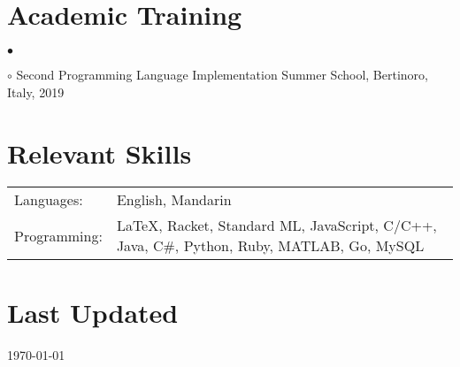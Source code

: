 \documentclass[margin,line]{res}
\newenvironment{list2}{
  \begin{list}{$\bullet$}{%
      \setlength{\itemsep}{0in}
      \setlength{\parsep}{0in} \setlength{\parskip}{0in}
      \setlength{\topsep}{0in} \setlength{\partopsep}{0in}
      \setlength{\leftmargin}{0.2in}}}{\end{list}}
\begin{document}
\begin{resume}
\section{\sc Academic Training}

\begin{list2}
\item[$\circ$] Second Programming Language Implementation Summer School, Bertinoro, Italy, 2019
\end{list2}


\section{\sc Relevant Skills}

\vspace{.05in}
\begin{tabular}{@{}p{0.8in}p{4.25in}}

Languages:& English, Mandarin \\
Programming:& \LaTeX, Racket, Standard ML, JavaScript, C/C++, Java, C\#, Python, Ruby, MATLAB, Go, MySQL

\end{tabular}


\section{\sc Last Updated}
\today


\end{resume}
\end{document}

